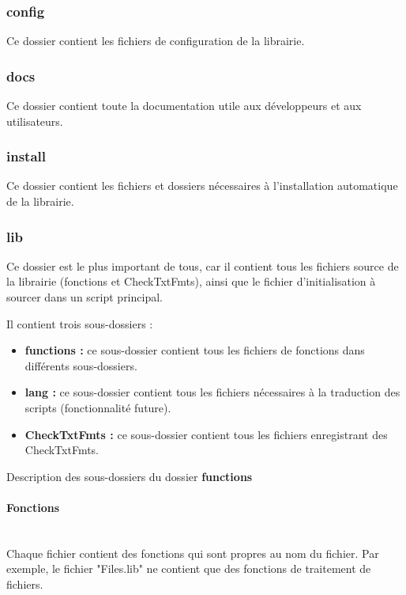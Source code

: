 \documentclass[a4paper,10pt]{article}
\begin{document}
\color{blue}
\subsubsection{config}\color{white}
Ce dossier contient les fichiers de configuration de la librairie.

\color{blue}
\subsubsection{docs}\color{white}
Ce dossier contient toute la documentation utile aux développeurs et aux utilisateurs.

\color{blue}
\subsubsection{install}\color{white}
Ce dossier contient les fichiers et dossiers nécessaires à l'installation automatique de la librairie.

\color{blue}
\subsubsection{lib}\color{white}
Ce dossier est le plus important de tous, car il contient tous les fichiers source de la librairie (fonctions et CheckTxtFmts), ainsi que le fichier d'initialisation à sourcer dans un script principal.

Il contient trois sous-dossiers :
\begin{itemize}
    \item \color{lime}\textbf{functions\color{white} :} \color{white} ce sous-dossier contient tous les fichiers de fonctions dans différents sous-dossiers.
    \item \color{lime}\textbf{lang\color{white} :} \color{white} ce sous-dossier contient tous les fichiers nécessaires à la traduction des scripts (fonctionnalité future).
    \item \color{lime}\textbf{CheckTxtFmts\color{white} :} \color{white} ce sous-dossier contient tous les fichiers enregistrant des CheckTxtFmts.
\end{itemize}

Description des sous-dossiers du dossier \textbf{functions}
\setcounter{secnumdepth}{4}
\paragraph{Fonctions}\mbox{}\\
Chaque fichier contient des fonctions qui sont propres au nom du fichier. Par exemple, le fichier "Files.lib" ne contient que des fonctions de traitement de fichiers.
\end{document}
